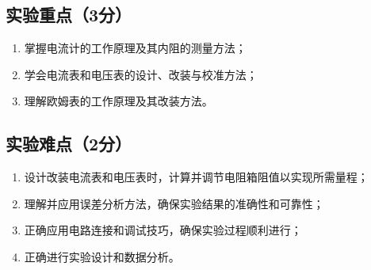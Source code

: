 \documentclass[]{../../templates/Report}%
\begin{document}
\subsection{实验重点（3分）}
\begin{enumerate}
    \item 掌握电流计的工作原理及其内阻的测量方法；
    \item 学会电流表和电压表的设计、改装与校准方法；
    \item 理解欧姆表的工作原理及其改装方法。
\end{enumerate}

\subsection{实验难点（2分）}
\begin{enumerate}
    \item 设计改装电流表和电压表时，计算并调节电阻箱阻值以实现所需量程；
    \item 理解并应用误差分析方法，确保实验结果的准确性和可靠性；
    \item 正确应用电路连接和调试技巧，确保实验过程顺利进行；
    \item 正确进行实验设计和数据分析。
\end{enumerate}
\end{document}
